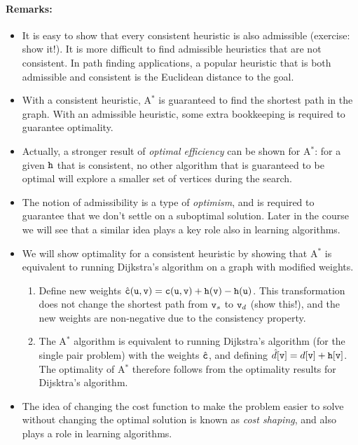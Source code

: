 \paragraph{Remarks:}
\begin{itemize}
  \item It is easy to show that every consistent heuristic is also admissible (exercise: show it!). It is more difficult to find admissible heuristics that are not consistent. In path finding applications, a popular heuristic that is both admissible and consistent is the Euclidean distance to the goal.
  \item With a consistent heuristic, A$^*$ is guaranteed to find the shortest path in the graph. With an admissible heuristic, some extra bookkeeping is required to guarantee optimality. 
  \item Actually, a stronger result of \textit{optimal efficiency} can be shown for A$^*$: for a given ${\tt h}$ that is consistent, no other algorithm that is guaranteed to be optimal will explore a smaller set of vertices during the search.
  \item The notion of admissibility is a type of \emph{optimism}, and is required to guarantee that we don't settle on a suboptimal solution. Later in the course we will see that a similar idea plays a key role also in learning algorithms. 
  \item We will show optimality for a consistent heuristic by showing that A$^*$ is equivalent to running Dijkstra's algorithm on a graph with modified weights.
  \begin{enumerate}
      \item Define new weights $\hat{{\tt c}}({\tt u},{\tt v}) = {\tt c}({\tt u},{\tt v}) + {\tt h}({\tt v}) - {\tt h}({\tt u})$. This transformation does not change the shortest path from ${\tt v}_s$ to ${\tt v}_d$ (show this!), and the new weights are non-negative due to the consistency property.
      \item The A$^*$ algorithm is equivalent to running Dijkstra's algorithm (for the single pair problem) with the weights $\hat{{\tt c}}$, and defining $\hat{d}[{\tt v}] = d[{\tt v}] + {\tt h}[{\tt v}]$. The optimality of A$^*$ therefore follows from the optimality results for Dijsktra's algorithm.
  \end{enumerate}
  \item The idea of changing the cost function to make the problem easier to solve without changing the optimal solution is known as \textit{cost shaping}, and also plays a role in learning algorithms.
\end{itemize}

